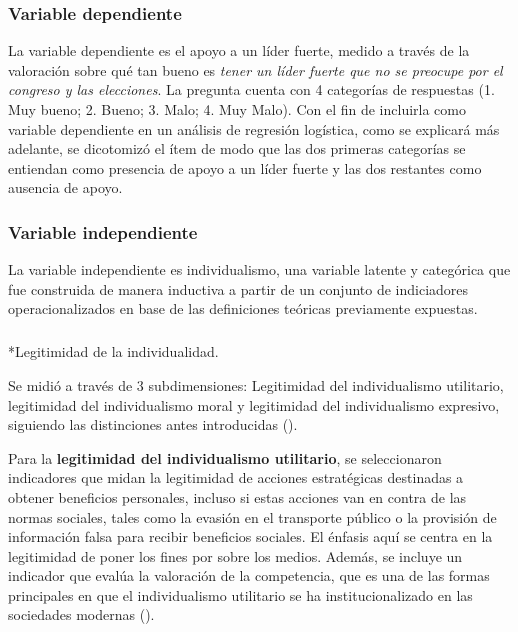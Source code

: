 \documentclass[
  letterpaper,
  DIV=11,
  numbers=noendperiod]{scrartcl}
\makeatletter
\let\oldsubparagraph\subparagraph
\renewcommand{\subparagraph}{
    \@ifstar
      \xxxSubParagraphStar
      \xxxSubParagraphNoStar
  }
\newcommand{\xxxSubParagraphStar}[1]{\oldsubparagraph*{#1}\mbox{}}
\newcommand{\xxxSubParagraphNoStar}[1]{\oldsubparagraph{#1}\mbox{}}
\makeatother
\begin{document}
\subsubsection*{Variable dependiente}\label{variable-dependiente}

La variable dependiente es el apoyo a un líder fuerte, medido a través
de la valoración sobre qué tan bueno es \emph{tener un líder fuerte que
no se preocupe por el congreso y las elecciones}. La pregunta cuenta con
4 categorías de respuestas (1. Muy bueno; 2. Bueno; 3. Malo; 4. Muy
Malo). Con el fin de incluirla como variable dependiente en un análisis
de regresión logística, como se explicará más adelante, se dicotomizó el
ítem de modo que las dos primeras categorías se entiendan como presencia
de apoyo a un líder fuerte y las dos restantes como ausencia de apoyo.

\subsubsection*{Variable independiente}\label{variable-independiente}

La variable independiente es individualismo, una variable latente y
categórica que fue construida de manera inductiva a partir de un
conjunto de indiciadores operacionalizados en base de las definiciones
teóricas previamente expuestas.

\subparagraph*{Legitimidad de la
individualidad.}\label{legitimidad-de-la-individualidad.}

Se midió a través de 3 subdimensiones: Legitimidad del individualismo
utilitario, legitimidad del individualismo moral y legitimidad del
individualismo expresivo, siguiendo las distinciones antes introducidas
().

Para la \textbf{legitimidad del individualismo utilitario}, se
seleccionaron indicadores que midan la legitimidad de acciones
estratégicas destinadas a obtener beneficios personales, incluso si
estas acciones van en contra de las normas sociales, tales como la
evasión en el transporte público o la provisión de información falsa
para recibir beneficios sociales. El énfasis aquí se centra en la
legitimidad de poner los fines por sobre los medios. Además, se incluye
un indicador que evalúa la valoración de la competencia, que es una de
las formas principales en que el individualismo utilitario se ha
institucionalizado en las sociedades modernas
().
\end{document}
